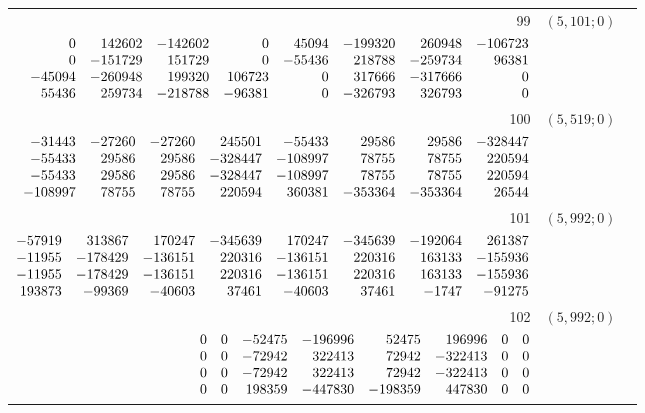 \documentclass[11pt]{article}
\theoremstyle{remark}
\numberwithin{equation}{section}
\begin{document}
\begin{longtable}{rcl}
99 & $(5,101;0)$ & \begin{tabular}[t]{@{}l@{}}$w_i=\displaystyle \frac{155574975945404459}{183032849054322824345600000000000000}$\\[3pt]{\scriptsize$\begin{array}{@{}rrrrrrrr@{}}0 & 142602 & -142602 & 0 & 45094 & -199320 & 260948 & -106723\\0 & -151729 & 151729 & 0 & -55436 & 218788 & -259734 & 96381\\-45094 & -260948 & 199320 & 106723 & 0 & 317666 & -317666 & 0\\55436 & 259734 & -218788 & -96381 & 0 & -326793 & 326793 & 0\end{array}$}\end{tabular}\\[8pt]
100 & $(5,519;0)$ & \begin{tabular}[t]{@{}l@{}}$w_i=\displaystyle \frac{441877492854601393}{8960031270109635801600000000000000000}$\\[3pt]{\scriptsize$\begin{array}{@{}rrrrrrrr@{}}-31443 & -27260 & -27260 & 245501 & -55433 & 29586 & 29586 & -328447\\-55433 & 29586 & 29586 & -328447 & -108997 & 78755 & 78755 & 220594\\-55433 & 29586 & 29586 & -328447 & -108997 & 78755 & 78755 & 220594\\-108997 & 78755 & 78755 & 220594 & 360381 & -353364 & -353364 & 26544\end{array}$}\end{tabular}\\[8pt]
101 & $(5,992;0)$ & \begin{tabular}[t]{@{}l@{}}$w_i=\displaystyle \frac{1983081816301178287}{4846128124605174192256000000000000000}$\\[3pt]{\scriptsize$\begin{array}{@{}rrrrrrrr@{}}-57919 & 313867 & 170247 & -345639 & 170247 & -345639 & -192064 & 261387\\-11955 & -178429 & -136151 & 220316 & -136151 & 220316 & 163133 & -155936\\-11955 & -178429 & -136151 & 220316 & -136151 & 220316 & 163133 & -155936\\193873 & -99369 & -40603 & 37461 & -40603 & 37461 & -1747 & -91275\end{array}$}\end{tabular}\\[8pt]
102 & $(5,992;0)$ & \begin{tabular}[t]{@{}l@{}}$w_i=\displaystyle \frac{1740690333499091}{2673862676511552000000000000000000}$\\[3pt]{\scriptsize$\begin{array}{@{}rrrrrrrr@{}}0 & 0 & -52475 & -196996 & 52475 & 196996 & 0 & 0\\0 & 0 & -72942 & 322413 & 72942 & -322413 & 0 & 0\\0 & 0 & -72942 & 322413 & 72942 & -322413 & 0 & 0\\0 & 0 & 198359 & -447830 & -198359 & 447830 & 0 & 0\end{array}$}\end{tabular}\\[8pt]

\end{longtable}
\end{document}
